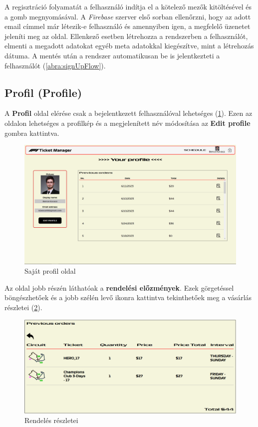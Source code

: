 A regisztráció folyamatát a felhasználó indítja el a kötelező mezők kitöltésével és a gomb megnyomásával. A \textit{Firebase} szerver első sorban ellenőrzni, hogy az adott email címmel már létezik-e felhasználó és amennyiben igen, a megfelelő üzenetet jeleníti meg az oldal. Ellenkező esetben létrehozza a rendszerben a felhasználót, elmenti a megadott adatokat egyéb meta adatokkal kiegészítve, mint a létrehozás dátuma. A mentés után a rendszer automatikusan be is jelentkezteti a felhasználót (\ref{abra:signUpFlow}).

\subsection {Profil (Profile)}

A \textbf{Profil} oldal elérése csak a bejelentkezett felhasználóval lehetséges (\ref{abra:profile}). Ezen az oldalon lehetséges a profilkép és a megjelenített név módosítása az \textbf{Edit profile} gombra kattintva.

\begin{figure}[!h]
	\centering
	\includegraphics[scale=0.2]{images/profile}
	\caption{Saját profil oldal}
	\label{abra:profile}
\end{figure}

Az oldal jobb részén láthatóak a \textbf{rendelési előzmények}. Ezek görgetéssel böngészhetőek és a jobb szélén levő ikonra kattintva tekinthetőek meg a vásárlás részletei (\ref{abra:previousOrders}).

\begin{figure}[!h]
	\centering
	\includegraphics[scale=0.3]{images/previousOrders}
	\caption{Rendelés részletei}
	\label{abra:previousOrders}
\end{figure}

